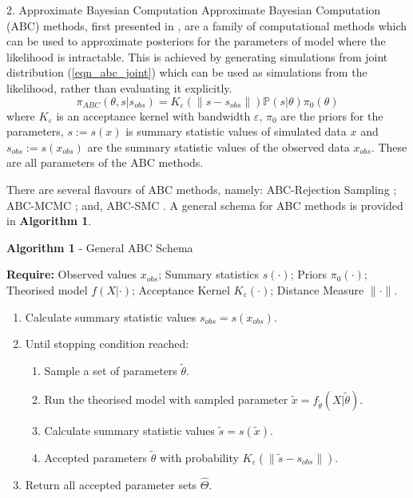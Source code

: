 \documentclass[ %
                  author={Dominic Hutchinson},
                supervisor={Dr. Daniel Lawson \& Dr. Sam Tickle},
                    degree={MEng Maths and Computer Science},
                     title={Bayesian Modelling of Epidemic Events},
                  subtitle={Summary Statistic Selection for Approximate Bayesian Computation Methods},
                      type={},
                      year={2021}
               ]{poster}
\begin{document}
\begin{frame}{}
\begin{columns}[t]
\begin{column}{0.475\linewidth}
\begin{block}{\Large 2. Approximate Bayesian Computation}
        Approximate Bayesian Computation (ABC) methods, first presented in \cite[]{inferring_coalescence_times_from_dna_sequence_data}, are a family of computational methods which can be used to approximate posteriors for the parameters of model where the likelihood is intractable. This is achieved by generating simulations from joint distribution (\ref{eqn_abc_joint}) which can be used as simulations from the likelihood, rather than evaluating it explicitly.
        \begin{equation}\label{eqn_abc_joint}
          \pi_{ABC}(\theta,s|s_{obs})=K_\varepsilon(\|s-s_{obs}\|)\mathbb{P}(s|\theta)\pi_0(\theta)
        \end{equation}
        where $K_\varepsilon$ is an acceptance kernel with bandwidth $\varepsilon$, $\pi_0$ are the priors for the parameters, $s:=s(x)$ is summary statistic values of simulated data $x$ and $s_{obs}:=s(x_{obs})$ are the summary statistic values of the observed data $x_{obs}$. These are all parameters of the ABC methods.
        \par There are several flavours of ABC methods, namely: ABC-Rejection Sampling \cite[]{inferring_coalescence_times_from_dna_sequence_data}; ABC-MCMC \cite[]{mcmc_wo_likelihood}; and, ABC-SMC \cite[]{SMC_wo_likelihood}. A general schema for ABC methods is provided in \textbf{Algorithm 1}.

      \end{block}

      \begin{block}{\footnotesize \textbf{Algorithm 1} - General ABC Schema }
        {\footnotesize
          \par\textbf{Require:} Observed values $x_{obs}$; Summary statistics $s(\cdot)$; Priors $\pi_0(\cdot)$; Theorised model $f(X|\cdot)$; Acceptance Kernel $K_\varepsilon(\cdot)$; Distance Measure $\|\cdot\|$.
          \begin{enumerate}[label=\arabic*,font=\footnotesize]
            \item Calculate summary statistic values $s_{obs}=s(x_{obs})$.
            \item Until stopping condition reached:
            \begin{enumerate}[label=\Roman*,font=\footnotesize]
              \item Sample a set of parameters $\tilde\theta$.
              \item Run the theorised model with sampled parameter $\tilde{x}=f_{\tilde\theta}(X|\tilde\theta)$.
              \item Calculate summary statistic values $\tilde{s}=s(\tilde{x})$.
              \item Accepted parameters $\tilde\theta$ with probability $K_\varepsilon(\|\tilde{s}-s_{obs}\|)$.
            \end{enumerate}
            \item Return all accepted parameter sets $\hat\Theta$.
          \end{enumerate}
        }
      \end{block}


\end{column}
\end{columns}
\end{frame}
\end{document}

